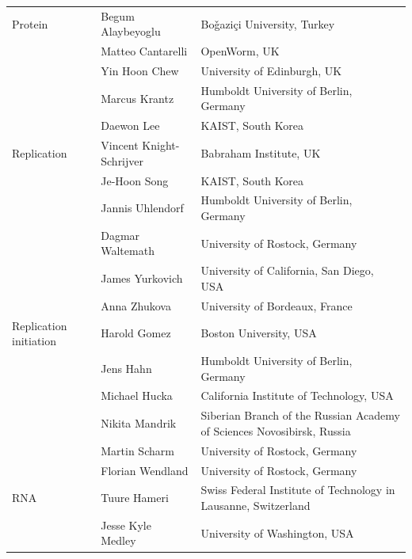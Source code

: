 \documentclass[journal,transmag]{IEEEtran}
\begin{document}
\begin{table}[ht!]
\begin{tabularx}{\textwidth}{l||l||X}
Protein                & Begum Alaybeyoglu                & Bo\v{g}azi\c{c}i University, Turkey\\
                       & Matteo Cantarelli                & OpenWorm, UK\\
                       & Yin Hoon Chew                    & University of Edinburgh, UK\\
                       & Marcus Krantz                    & Humboldt University of Berlin, Germany\\
                       & Daewon Lee                       & KAIST, South Korea\\\hline
Replication            & Vincent Knight-Schrijver         & Babraham Institute, UK\\
                       & Je-Hoon Song                     & KAIST, South Korea\\
                       & Jannis Uhlendorf                 & Humboldt University of Berlin, Germany\\
                       & Dagmar Waltemath                 & University of Rostock, Germany\\
                       & James Yurkovich                  & University of California, San Diego, USA\\
                       & Anna Zhukova                     & University of Bordeaux, France\\\hline
Replication initiation & Harold Gomez                     & Boston University, USA\\
                       & Jens Hahn                        & Humboldt University of Berlin, Germany\\
                       & Michael Hucka                    & California Institute of Technology, USA\\
                       & Nikita Mandrik                    & Siberian Branch of the Russian Academy of Sciences Novosibirsk, Russia\\
                       & Martin Scharm                    & University of Rostock, Germany\\
                       & Florian Wendland                 & University of Rostock, Germany\\\hline
RNA                    & Tuure Hameri                     & Swiss Federal Institute of Technology in Lausanne, Switzerland\\
                       & Jesse Kyle Medley                & University of Washington, USA\\

\end{tabularx}
\end{table}
\end{document}
